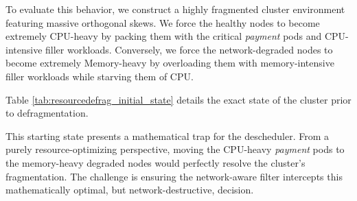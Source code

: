 To evaluate this behavior, we construct a highly fragmented cluster environment featuring massive orthogonal skews. We force the healthy nodes to become extremely CPU-heavy by packing them with the critical \textit{payment} pods and CPU-intensive filler workloads. Conversely, we force the network-degraded nodes to become extremely Memory-heavy by overloading them with memory-intensive filler workloads while starving them of CPU. 

Table \ref{tab:resourcedefrag_initial_state} details the exact state of the cluster prior to defragmentation.

\begin{table}[H]
    \centering
    \caption{Resource Allocation: Initial State for ResourceDefragmentation Strategy}
    \label{tab:resourcedefrag_initial_state}
\end{table}

This starting state presents a mathematical trap for the descheduler. From a purely resource-optimizing perspective, moving the CPU-heavy \textit{payment} pods to the memory-heavy degraded nodes would perfectly resolve the cluster's fragmentation. The challenge is ensuring the network-aware filter intercepts this mathematically optimal, but network-destructive, decision.

